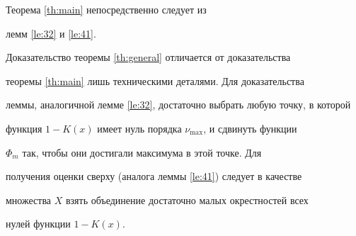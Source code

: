 Теорема \ref{th:main} непосредственно следует из 


лемм \ref{le:32} и \ref{le:41}.





Доказательство теоремы \ref{th:general} отличается от доказательства 


теоремы \ref{th:main} лишь техническими деталями. Для доказательства 


леммы, аналогичной лемме \ref{le:32}, достаточно выбрать любую точку, в которой 


функция $1-K(x)$ имеет нуль порядка $\nu_{\max}$, и сдвинуть функции


$\Phi_{m}$ так, чтобы они достигали максимума в этой точке. Для 


получения оценки сверху (аналога леммы \ref{le:41}) следует в качестве 


множества $X$ взять объединение достаточно малых окрестностей всех 


нулей функции $1-K(x)$.








